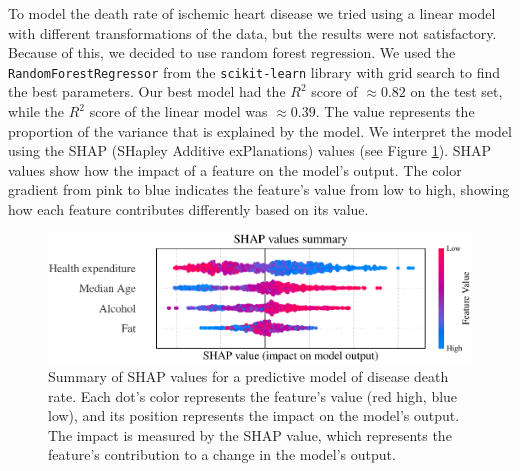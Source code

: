 

To model the death rate of ischemic heart disease we tried using a linear model with different transformations of the data, but the results were not satisfactory. 
Because of this, we decided to use random forest regression. 
We used the \texttt{RandomForestRegressor} from the \texttt{scikit-learn} library \citep{scikit-learn} with grid search to find the best parameters. Our best model had the 
$R^2$ score of $\approx0.82$ on the test set, while the $R^2$ score of the linear model was $\approx0.39$. The value represents the proportion of the variance that 
is explained by the model. We interpret the model using the SHAP (SHapley Additive exPlanations) values \citep{NIPS2017_7062} (see Figure \ref{shap_values}). SHAP values 
show how the impact of a feature on the model's output. The color gradient from pink to blue indicates the feature's value from low to high, 
showing how each feature contributes differently based on its value.


\begin{figure}[ht]
    \vskip 0.2in
    \begin{center}
    \centerline{\includegraphics[width=\columnwidth]{fig/shap_values_summary.pdf}}
    \caption{Summary of SHAP values for a predictive model of disease death rate. 
    Each dot's color represents the feature's value (red high, blue low), and its position represents the impact on the model's output.
    The impact is measured by the SHAP value, which represents the feature's contribution to a change in the model's output.}
    \label{shap_values}
    \end{center}
    \vskip -0.2in
\end{figure}

